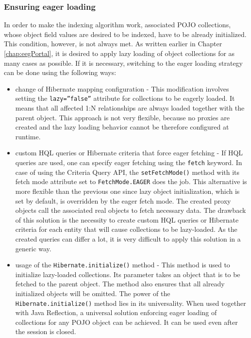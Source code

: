 \subsubsection{Ensuring eager loading}

In order to make the indexing algorithm work, associated POJO collections, whose object field values are desired to be indexed, have to be already initialized.
This condition, however, is not always met.
As written earlier in Chapter \ref{chap:eegPortal}, it is desired to apply lazy loading of object collections for as many cases as possible. If it is necessary, switching to the eager loading strategy can be done using the following ways:

\begin{itemize}
	\item{change of Hibernate mapping configuration}
	- This modification involves setting the \texttt{lazy=''false''} attribute for collections to be eagerly loaded. 
	It means that all affected 1:N relationships are always loaded together with the parent object. 
	This approach is not very flexible, because no proxies are created and the lazy loading behavior cannot be therefore configured at runtime.

	\item {custom HQL queries or Hibernate criteria that force eager fetching}
	- If HQL queries are used, one can specify eager fetching using the \texttt{fetch} keyword. 
	In case of using the Criteria Query API, the \texttt{setFetchMode()} method with its fetch mode attribute set to \texttt{FetchMode.EAGER} does the job.
	This alternative is more flexible than the previous one since lazy object initialization, which is set by default, is overridden by the eager fetch mode. 
	The created proxy objects call the associated real objects to fetch necessary data. 
	The drawback of this solution is the necessity to create custom HQL queries or Hibernate criteria for each entity that will cause collections to be lazy-loaded. As the created queries can differ a lot, it is very difficult to apply this solution in a generic way.
	

	\item {usage of the \texttt{Hibernate.initialize()} method} 
		- This method is used to initialize lazy-loaded collections. Its parameter takes an object that is to be fetched to the parent object.
		The method also ensures that all already initialized objects will be omitted.
		The power of the \texttt{Hibernate.initialize()} method lies in its universality. When used together with Java Reflection, a universal solution enforcing eager loading of collections for any POJO object can be achieved. 
		It can be used even after the session is closed.

\end{itemize}


